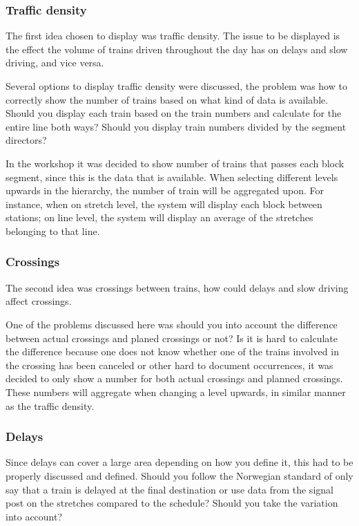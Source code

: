 \subsubsection{Traffic density} %
\label{ssub:traffic_density}
The first idea chosen to display was traffic density. The issue to be displayed
is the effect the volume of trains driven throughout the day has on delays and
slow driving, and vice versa.

Several options to display traffic density were discussed, the problem was how
to correctly show the number of trains based on what kind of data is 
available. Should you display each train based on the train numbers and 
calculate for the entire line both ways? Should you display train numbers 
divided by the segment directors? 

In the workshop it was decided to show number of trains that passes each block
segment, since this is the data that is available. When selecting different 
levels upwards in the hierarchy, the number of train will be aggregated upon.
For instance, when on stretch level, the system will display each block 
between stations; on line level, the system will display an average of the 
stretches belonging to that line.


\subsubsection{Crossings} %
\label{ssub:crossings}
The second idea was crossings between trains, how could delays and slow 
driving affect crossings. 

One of the problems discussed here was should you into account the difference
between actual crossings and planed crossings or not? Is it is hard to
calculate the difference because one does not know whether one of the trains
involved in the crossing has been canceled or other hard to document
occurrences, it was decided to only show a number for both actual crossings 
and planned crossings. These numbers will aggregate when changing a level 
upwards, in similar manner as the traffic density. 

\subsubsection{Delays} %
\label{ssub:delays}
Since delays can cover a large area depending on how you define it, this had to
be properly discussed and defined. Should you follow the Norwegian standard
\cite{jernbaneverketPunklighetsTall} of only say that a train is delayed at the
final destination or use data from the signal post on the stretches compared to
the schedule? Should you take the variation into account?

